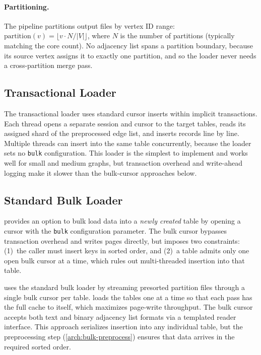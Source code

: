 \paragraph{Partitioning.}
The pipeline partitions output files by vertex ID range: $\text{partition}(v) = \lfloor v \cdot N / |V| \rfloor$, where $N$ is the number of partitions (typically matching the core count).
No adjacency list spans a partition boundary, because its source vertex assigns it to exactly one partition, and so the loader never needs a cross-partition merge pass.

\subsection{Transactional Loader}
\label{arch:bulk-txn}

The transactional loader uses standard \wt{} cursor inserts within implicit transactions.
Each thread opens a separate session and cursor to the target tables, reads its assigned shard of the preprocessed edge list, and inserts records line by line.
Multiple threads can insert into the same table concurrently, because the loader sets no \texttt{bulk} configuration.
This loader is the simplest to implement and works well for small and medium graphs, but transaction overhead and write-ahead logging make it slower than the bulk-cursor approaches below.

\subsection{Standard \wt{} Bulk Loader}
\label{arch:bulk-wt}

\wt{} provides an option to bulk load data into a \emph{newly created} table by opening a cursor with the \texttt{bulk} configuration parameter.
The bulk cursor bypasses transaction overhead and writes pages directly, but imposes two constraints: (1)~the caller must insert keys in sorted order, and (2)~a table admits only one open bulk cursor at a time, which rules out multi-threaded insertion into that table.

\project{} uses the standard bulk loader by streaming presorted partition files through a single bulk cursor per table.
\project{} loads the tables one at a time so that each pass has the full \wt{} cache to itself, which maximizes page-write throughput.
The bulk cursor accepts both text and binary adjacency list formats via a templated reader interface.
This approach serializes insertion into any individual table, but the preprocessing step (\autoref{arch:bulk-preprocess}) ensures that data arrives in the required sorted order.

